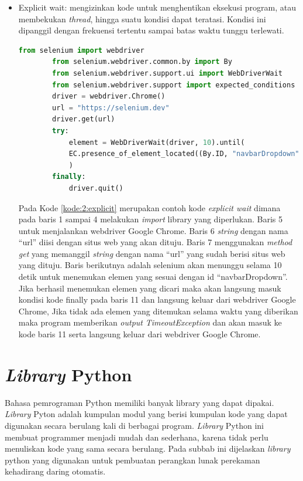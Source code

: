 \begin{itemize}
	\item Explicit wait: mengizinkan kode untuk menghentikan eksekusi program, atau membekukan \textit{thread}, hingga suatu kondisi dapat teratasi. Kondisi ini dipanggil dengan frekuensi tertentu sampai batas waktu tunggu terlewati.
	\begin{lstlisting}[language=python, caption=Contoh kode Explicit wait, label=kode:2:explicit]
		from selenium import webdriver
		from selenium.webdriver.common.by import By
		from selenium.webdriver.support.ui import WebDriverWait
		from selenium.webdriver.support import expected_conditions as EC
		driver = webdriver.Chrome()
		url = "https://selenium.dev"
		driver.get(url)	
		try:
			element = WebDriverWait(driver, 10).until(
			EC.presence_of_element_located((By.ID, "navbarDropdown"))
			)
		finally:
			driver.quit()
	\end{lstlisting}
	Pada Kode \ref{kode:2:explicit} merupakan contoh kode \textit{explicit wait} dimana pada baris 1 sampai 4 melakukan \textit{import} library yang diperlukan. Baris 5 untuk menjalankan webdriver Google Chrome. Baris 6 \textit{string} dengan nama ``url'' diisi dengan situs web yang akan dituju. Baris 7 menggunakan \textit{method get} yang memanggil \textit{string} dengan nama ``url'' yang sudah berisi situs web yang dituju. Baris berikutnya adalah selenium akan menunggu selama 10 detik untuk menemukan elemen yang sesuai dengan id ``navbarDropdown''. Jika berhasil menemukan elemen yang dicari maka akan langsung masuk kondisi kode finally pada baris 11 dan langsung keluar dari webdriver Google Chrome, Jika tidak ada elemen yang ditemukan selama waktu yang diberikan maka program memberikan \textit{output} \textit{TimeoutException} dan akan masuk ke kode baris 11 serta langsung keluar dari webdriver Google Chrome.	
\end{itemize}

\section{\textit{Library} Python}
\label{sec:library}
Bahasa pemrograman Python memiliki banyak library yang dapat dipakai. \textit{Library} Pyton adalah kumpulan modul yang berisi kumpulan kode yang dapat digunakan secara berulang kali di berbagai program. \textit{Library} Python ini membuat programmer menjadi mudah dan sederhana, karena tidak perlu menuliskan kode yang sama secara berulang. Pada subbab ini dijelaskan \textit{library} python yang digunakan untuk pembuatan perangkan lunak perekaman kehadirang daring otomatis.


